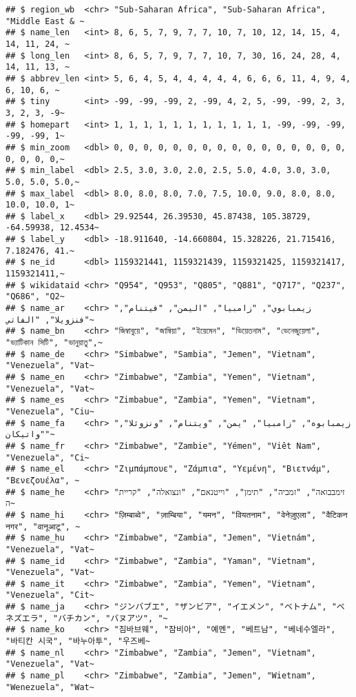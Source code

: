 \documentclass[
]{article}
\begin{document}
\begin{verbatim}
## $ region_wb  <chr> "Sub-Saharan Africa", "Sub-Saharan Africa", "Middle East & ~
## $ name_len   <int> 8, 6, 5, 7, 9, 7, 7, 10, 7, 10, 12, 14, 15, 4, 14, 11, 24, ~
## $ long_len   <int> 8, 6, 5, 7, 9, 7, 7, 10, 7, 30, 16, 24, 28, 4, 14, 11, 13, ~
## $ abbrev_len <int> 5, 6, 4, 5, 4, 4, 4, 4, 4, 6, 6, 6, 11, 4, 9, 4, 6, 10, 6, ~
## $ tiny       <int> -99, -99, -99, 2, -99, 4, 2, 5, -99, -99, 2, 3, 3, 2, 3, -9~
## $ homepart   <int> 1, 1, 1, 1, 1, 1, 1, 1, 1, 1, 1, -99, -99, -99, -99, -99, 1~
## $ min_zoom   <dbl> 0, 0, 0, 0, 0, 0, 0, 0, 0, 0, 0, 0, 0, 0, 0, 0, 0, 0, 0, 0,~
## $ min_label  <dbl> 2.5, 3.0, 3.0, 2.0, 2.5, 5.0, 4.0, 3.0, 3.0, 5.0, 5.0, 5.0,~
## $ max_label  <dbl> 8.0, 8.0, 8.0, 7.0, 7.5, 10.0, 9.0, 8.0, 8.0, 10.0, 10.0, 1~
## $ label_x    <dbl> 29.92544, 26.39530, 45.87438, 105.38729, -64.59938, 12.4534~
## $ label_y    <dbl> -18.911640, -14.660804, 15.328226, 21.715416, 7.182476, 41.~
## $ ne_id      <dbl> 1159321441, 1159321439, 1159321425, 1159321417, 1159321411,~
## $ wikidataid <chr> "Q954", "Q953", "Q805", "Q881", "Q717", "Q237", "Q686", "Q2~
## $ name_ar    <chr> "زيمبابوي", "زامبيا", "اليمن", "فيتنام", "فنزويلا", "الفاتي~
## $ name_bn    <chr> "জিম্বাবুয়ে", "জাম্বিয়া", "ইয়েমেন", "ভিয়েতনাম", "ভেনেজুয়েলা", "ভ্যাটিকান সিটি", "ভানুয়াতু",~
## $ name_de    <chr> "Simbabwe", "Sambia", "Jemen", "Vietnam", "Venezuela", "Vat~
## $ name_en    <chr> "Zimbabwe", "Zambia", "Yemen", "Vietnam", "Venezuela", "Vat~
## $ name_es    <chr> "Zimbabue", "Zambia", "Yemen", "Vietnam", "Venezuela", "Ciu~
## $ name_fa    <chr> "زیمبابوه", "زامبیا", "یمن", "ویتنام", "ونزوئلا", "واتیکان"~
## $ name_fr    <chr> "Zimbabwe", "Zambie", "Yémen", "Viêt Nam", "Venezuela", "Ci~
## $ name_el    <chr> "Ζιμπάμπουε", "Ζάμπια", "Υεμένη", "Βιετνάμ", "Βενεζουέλα", ~
## $ name_he    <chr> "זימבבואה", "זמביה", "תימן", "וייטנאם", "ונצואלה", "קריית ה~
## $ name_hi    <chr> "ज़िम्बाब्वे", "ज़ाम्बिया", "यमन", "वियतनाम", "वेनेज़ुएला", "वैटिकन नगर", "वानूआटू", ~
## $ name_hu    <chr> "Zimbabwe", "Zambia", "Jemen", "Vietnám", "Venezuela", "Vat~
## $ name_id    <chr> "Zimbabwe", "Zambia", "Yaman", "Vietnam", "Venezuela", "Vat~
## $ name_it    <chr> "Zimbabwe", "Zambia", "Yemen", "Vietnam", "Venezuela", "Cit~
## $ name_ja    <chr> "ジンバブエ", "ザンビア", "イエメン", "ベトナム", "ベネズエラ", "バチカン", "バヌアツ", "~
## $ name_ko    <chr> "짐바브웨", "잠비아", "예멘", "베트남", "베네수엘라", "바티칸 시국", "바누아투", "우즈베~
## $ name_nl    <chr> "Zimbabwe", "Zambia", "Jemen", "Vietnam", "Venezuela", "Vat~
## $ name_pl    <chr> "Zimbabwe", "Zambia", "Jemen", "Wietnam", "Wenezuela", "Wat~

\end{verbatim}
\end{document}
